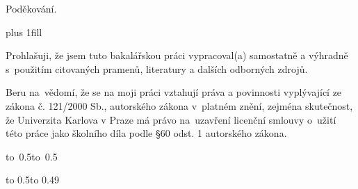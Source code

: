 \documentclass[12pt,a4paper]{report}
\let\openright=\clearpage
\begin{document}
\openright

\noindent
Poděkování.

\newpage


\vglue 0pt plus 1fill

\noindent
Prohlašuji, že jsem tuto bakalářskou práci vypracoval(a) samostatně a výhradně
s~použitím citovaných pramenů, literatury a dalších odborných zdrojů.

\medskip\noindent
Beru na~vědomí, že se na moji práci vztahují práva a povinnosti vyplývající
ze zákona č. 121/2000 Sb., autorského zákona v~platném znění, zejména skutečnost,
že Univerzita Karlova v Praze má právo na~uzavření licenční smlouvy o~užití této
práce jako školního díla podle §60 odst. 1 autorského zákona.

\vspace{10mm}

\hbox{\hbox to 0.5\hbox to 0.5}

\vspace{20mm}
\newpage


\vbox to 0.5\nobreak\vbox to 0.49
\end{document}
